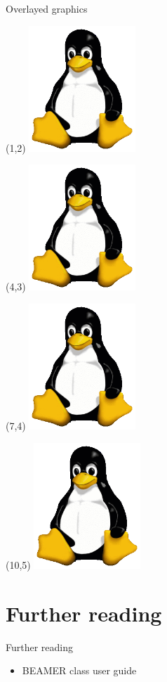\documentclass[11pt,t]{beamer}
\begin{document}
\begin{frame}{Overlayed graphics}
	\begin{textblock}{4}(1,2)
		\includegraphics[width=4cm,natwidth=265,natheight=314]{fig/Tux.png}
    \end{textblock}
    \begin{textblock}{4}(4,3)
		\includegraphics[width=4cm,natwidth=265,natheight=314]{fig/Tux.png}
    \end{textblock}
    \begin{textblock}{4}(7,4)
		\includegraphics[width=4cm,natwidth=265,natheight=314]{fig/Tux.png}
    \end{textblock}
    \begin{textblock}{4}(10,5)
		\includegraphics[width=4cm,natwidth=265,natheight=314]{fig/Tux.png}
    \end{textblock}
\end{frame}
\section{Further reading}
\begin{frame}[t]{Further reading}
	\begin{itemize}
		\item BEAMER class user guide 
	\end{itemize}
\end{frame}
\end{document}
